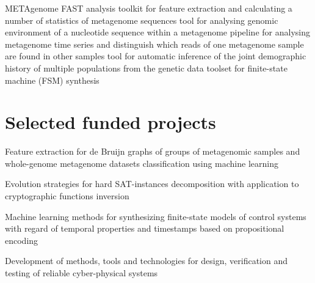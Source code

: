 \documentclass[11pt,a4paper,sans]{moderncv}        %
\begin{document}
        {}{METAgenome FAST analysis toolkit for feature extraction and calculating a number of statistics of metagenome sequences}
        {}{tool for analysing genomic environment of a nucleotide sequence within a metagenome}
        {}{pipeline for analysing metagenome time series and distinguish which reads of one metagenome sample are found in other samples}
        {}{tool for automatic inference of the joint demographic history of multiple populations from the genetic data}
        {}{toolset for finite-state machine (FSM) synthesis}

\section{Selected funded projects}


        {}{Feature extraction for de Bruijn graphs of groups of metagenomic samples 
           and whole-genome metagenome datasets classification using machine learning}

        {}{Evolution strategies for hard SAT-instances decomposition 
           with application to cryptographic functions inversion}

        {}{Machine learning methods for synthesizing finite-state models of control systems 
           with regard of temporal properties and timestamps based on propositional encoding}

        {}{Development of methods, tools and technologies for design, 
           verification and testing of reliable cyber-physical systems}
\end{document}
